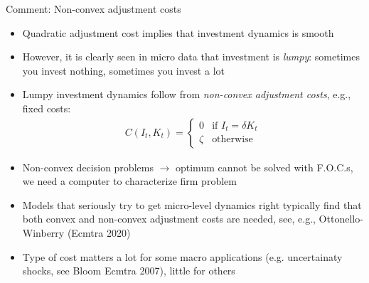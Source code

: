 \documentclass[9pt,xcolor={dvipsnames}]{beamer}
\newcommand{\bit}{\begin{itemize}}
\newcommand{\eit}{\end{itemize}}
\begin{document}
\begin{frame}{Comment: Non-convex adjustment costs}

\bit
\setlength\itemsep{1em} 

\item Quadratic adjustment cost implies that investment dynamics is smooth

\item However, it is clearly seen in micro data that investment is \emph{lumpy}: sometimes you invest nothing, sometimes you invest a lot

\item Lumpy investment dynamics follow from \emph{non-convex adjustment costs}, e.g., fixed costs:
\begin{eqnarray}
C(I_t, K_t) = \left\{
\begin{array}{cc}
0 & \text{if } I_t = \delta K_t \\
\zeta & \text{otherwise} 
\end{array} \right. \nonumber
\end{eqnarray}

\item Non-convex decision problems $\rightarrow$ optimum cannot be solved with F.O.C.s, we need a computer to characterize firm problem

\item Models that seriously try to get micro-level dynamics right typically find that both convex and non-convex adjustment costs are needed, see, e.g., Ottonello-Winberry (Ecmtra 2020)

\item Type of cost matters a lot for some macro applications (e.g. uncertainaty shocks, see Bloom Ecmtra 2007), little for others

\eit

\end{frame}
\end{document}
